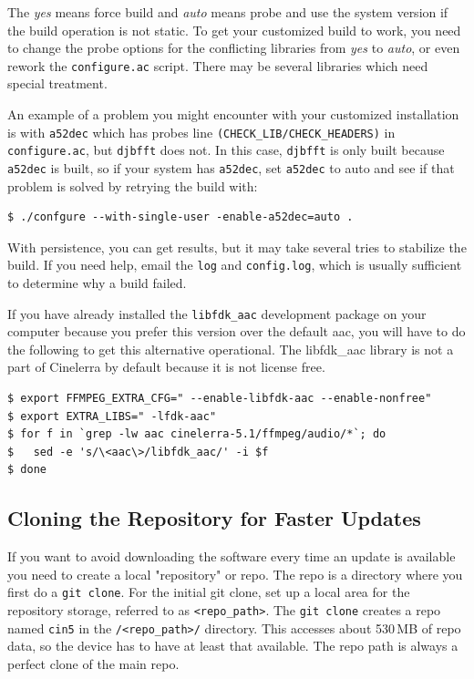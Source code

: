 The \textit{yes} means force build and \textit{auto} means probe and use the system version if the build operation is not static.  
To get your customized build to work, you need to change the probe options for the conflicting libraries from \textit{yes} to \textit{auto}, or even rework the \texttt{configure.ac} script.  
There may be several libraries which need special treatment.

An example of a problem you might encounter with your customized installation is with \texttt{a52dec} which has probes line \texttt{(CHECK\_LIB/CHECK\_HEADERS)} in \texttt{configure.ac}, but \texttt{djbfft} does not.  
In this case, \texttt{djbfft} is only built because \texttt{a52dec} is built, so if your system has \texttt{a52dec}, set \texttt{a52dec} to auto and see if that problem is solved by retrying the build with:  
\begin{lstlisting}[numbers=none]
$ ./confgure --with-single-user -enable-a52dec=auto .
\end{lstlisting}

With persistence, you can get results, but it may take several tries to stabilize the build.  
If you need help, email the \texttt{log} and \texttt{config.log}, which is usually sufficient to determine why a build failed.

If you have already installed the \texttt{libfdk\_aac} development package on your computer because you prefer this version over the default aac, you will have to do the following to get this alternative operational. The libfdk\_aac library is not a part of Cinelerra by default because it is not license free.

\begin{lstlisting}[numbers=none]
$ export FFMPEG_EXTRA_CFG=" --enable-libfdk-aac --enable-nonfree"
$ export EXTRA_LIBS=" -lfdk-aac"
$ for f in `grep -lw aac cinelerra-5.1/ffmpeg/audio/*`; do
$   sed -e 's/\<aac\>/libfdk_aac/' -i $f
$ done
\end{lstlisting}

\subsection{Cloning the Repository for Faster Updates}%
\label{sub:cloning_the_repository_for_faster_updates}

If you want to avoid downloading the software every time an update is available you need to create a local "repository" or repo.  
The repo is a directory where you first do a \texttt{git clone}.  
For the initial git clone, set up a local area for the repository storage, referred to as \texttt{<repo\_path>}.  
The \texttt{git clone} creates a repo named \texttt{cin5} in the \texttt{/<repo\_path>/} directory.  
This accesses about 530\,MB of repo data, so the device has to have at least that available.  
The repo path is always a perfect clone of the main repo.

